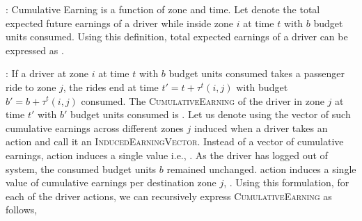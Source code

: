 
:
Cumulative Earning is a function of zone and time. Let {} denote the total expected future earnings of a driver
while inside zone $i$ at time $t$ with $b$ budget units consumed. Using this definition, total expected earnings of a driver can be expressed
as {}.

:
If a driver at zone $i$ at time $t$ with $b$ budget units consumed takes a passenger ride to zone $j$, the rides end at time 
$t' = t + \tau^t(i,j)$ with budget $b' = b + \tau^t(i,j)$ consumed. The \textsc{CumulativeEarning} of the driver in zone $j$ at time $t'$ with $b'$
budget units consumed is {}. Let us denote using {} the vector of such
cumulative earnings across different zones $j$ induced when a driver takes an action {\getpassengeraction} and call it an 
\textsc{InducedEarningVector}. Instead of a vector of cumulative earnings, {\gohome} action induces a single value i.e., {}. 
As the driver has logged out of system, the consumed budget units $b$ remained unchanged. {\relocate} action induces a single value of cumulative earnings per destination zone $j$, {}. 
Using this formulation, for each of the driver actions, we can recursively express \textsc{CumulativeEarning} as follows,
